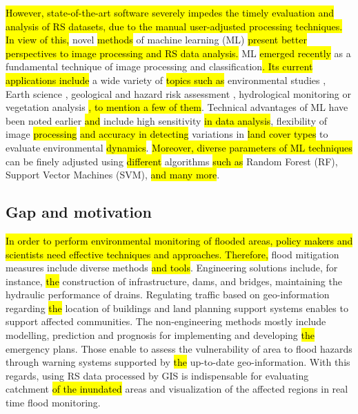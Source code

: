 \documentclass[water,article,submit,pdftex,moreauthors]{Definitions/mdpi}
\begin{document}
\hl{However, state-of-the-art software severely impedes the timely evaluation and analysis of RS datasets, due to the manual user-adjusted processing techniques. In view of this, }novel \hl{methods} of machine learning (ML) \hl{present better perspectives to image processing and RS data analysis.} ML \hl{emerged recently} as a fundamental technique of image processing and classification\hl{. Its current applications include} a wide variety of \hl{topics such as }environmental studies \cite{ROCHA2022107415}, Earth science \cite{LI2023103345,Lemenkova202306,XIONG2021145256}, geological and hazard risk assessment \cite{AOURAGH2023100939}, hydrological monitoring \cite{RAFIK2023101569} or vegetation analysis \cite{WU2023110723,Lemenkova202310,DOSSANTOS2022106753}\hl{, to mention a few of them}. Technical advantages of ML have been noted earlier \cite{9883389,coasts4010008} \hl{and} include high sensitivity \hl{in data analysis}, flexibility of image \hl{processing} \hl{and accuracy in detecting} variations in \hl{land cover types} to evaluate environmental \hl{dynamics}. \hl{Moreover, diverse parameters of ML techniques} can be finely adjusted using\hl{ different }algorithms \hl{such as} Random Forest (RF), Support Vector Machines (SVM), \hl{and many more}.

\subsection{Gap and motivation}

\hl{In order to perform environmental monitoring of flooded areas, policy makers and scientists need effective techniques and approaches. Therefore, }flood mitigation measures include diverse\hl{ }methods \hl{and tools}. Engineering solutions include, for instance, \hl{the }construction of infrastructure, dams, and bridges, maintaining the hydraulic performance of drains. Regulating traffic based on geo-information regarding \hl{the }location of buildings and land planning support systems enables to support affected communities. The non-engineering methods mostly include modelling, prediction and prognosis\hl{ }for implementing and developing \hl{the }emergency plans. Those enable to assess the vulnerability of area to flood hazards through warning systems supported by \hl{the }up-to-date geo-information. With this regards, using\hl{ }RS data processed by GIS is indispensable for evaluating catchment \hl{of the inundated} areas and visualization of the affected regions in real time flood monitoring.
\end{document}
